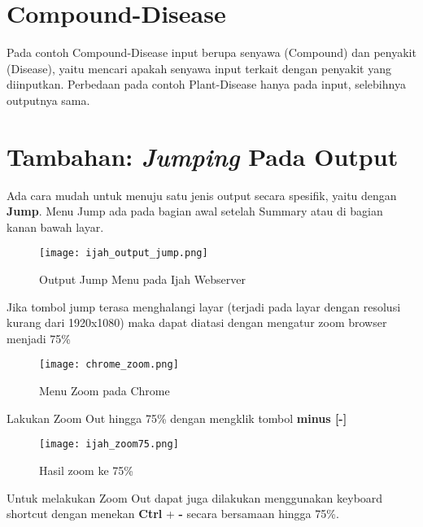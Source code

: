 \section{Compound-Disease}
Pada contoh Compound-Disease input berupa senyawa (Compound) dan penyakit (Disease), yaitu mencari apakah senyawa input terkait dengan penyakit yang diinputkan. Perbedaan pada contoh Plant-Disease hanya pada input, selebihnya outputnya sama.

\section{Tambahan: \emph{Jumping} Pada Output}
Ada cara mudah untuk menuju satu jenis output secara spesifik, yaitu dengan \textbf{Jump}. Menu Jump ada pada bagian awal setelah Summary atau di bagian kanan bawah layar.

\begin{figure}[H]
	\centering
	\texttt{[image: ijah\_output\_jump.png]}
	\caption{Output Jump Menu pada Ijah Webserver}
	\label{fig:ijah_output_jump}
\end{figure}

Jika tombol jump terasa menghalangi layar (terjadi pada layar dengan resolusi kurang dari 1920x1080) maka dapat diatasi dengan mengatur zoom browser menjadi 75\%

\begin{figure}[H]
	\centering
	\texttt{[image: chrome\_zoom.png]}
	\caption{Menu Zoom pada Chrome}
	\label{fig:chrome_zoom}
\end{figure}

Lakukan Zoom Out hingga 75\% dengan mengklik tombol \textbf{minus [-]}

\begin{figure}[H]
	\centering
	\texttt{[image: ijah\_zoom75.png]}
	\caption{Hasil zoom ke 75\%}
	\label{fig:ijah_zoom75}
\end{figure}

Untuk melakukan Zoom Out dapat juga dilakukan menggunakan keyboard shortcut dengan menekan \textbf{Ctrl} + \textbf{-} secara bersamaan hingga 75\%.



